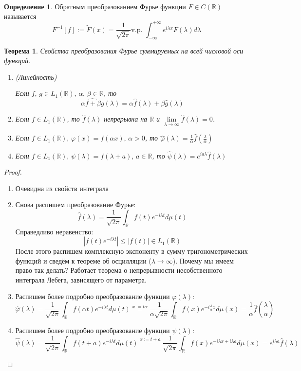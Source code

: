 \documentclass[a4paper,12pt]{article}
\renewcommand{\phi}{\ensuremath{\varphi}}
\renewcommand{\leq}{\ensuremath{\leqslant}}
\theoremstyle{plain}
\newtheorem{theorem}{Теорема}[section]
\theoremstyle{definition}
\newtheorem{definition}{Определение}[section]
\theoremstyle{remark}
\begin{document}
\begin{definition}
	Обратным преобразованием Фурье функции $F \in C(\mathbb{R})$ называется
	\[F^{-1}[f] := \tilde{F}(x) = \frac{1}{\sqrt{2\pi}} \text{v.p. }\int_{-\infty}^{+\infty}e^{i\lambda x}F(\lambda)d\lambda\]
\end{definition}

\begin{theorem}
	Свойства преобразования Фурье суммируемых на всей числовой оси функций.

	\begin{enumerate}
		\item (Линейность)

		      Если $f,\,g \in L_1(\mathbb{R}),\, \alpha,\, \beta \in \mathbb{R}$, то
		      \[\widehat{\alpha f + \beta g}(\lambda) = \alpha\hat{f}(\lambda) + \beta\hat{g}(\lambda)\]
		\item Если $f \in L_1(\mathbb{R})$, то $\hat{f}(\lambda)$ непрерывна на $\mathbb{R}$ и $\lim\limits_{\lambda \to \infty}\hat{f}(\lambda) = 0$.
		\item Если $f \in L_1(\mathbb{R}),\, \phi(x) = f(\alpha x),\, \alpha > 0$, то $\hat{\phi}(\lambda) = \frac{1}{\alpha}\hat{f}(\frac{\lambda}{\alpha})$
		\item Если $f \in L_1(\mathbb{R}),\, \psi(\lambda) = f(\lambda + a),\, a \in \mathbb{R}$, то $\hat{\psi}(\lambda) = e^{ia\lambda}\hat{f}(\lambda)$
	\end{enumerate}
\end{theorem}
\begin{proof}
	\begin{enumerate}
		\item Очевидна из свойств интеграла
		\item Снова распишем преобразование Фурье:
		      \[\hat{f}(\lambda) = \frac{1}{\sqrt{2\pi}}\int_\mathbb{R} f(t)e^{-i\lambda t}d\mu(t)\]
		      Справедливо неравенство:
		      \[|f(t)e^{-i\lambda t}| \leq |f(t)| \in L_1(\mathbb{R})\]
		      После этого распишем комплексную экспоненту в сумму тригонометрических функций и сведём к теореме об осцилляции ($\lambda \to \infty$). Почему мы имеем право так делать? Работает теорема о непрерывности несобственного интеграла Лебега, зависящего от параметра.
		\item Распишем более подробно преобразование функции $\phi(\lambda)$:
		      \[\hat{\phi}(\lambda) = \frac{1}{\sqrt{2\pi}}\int_\mathbb{R} f(\alpha t)e^{-i\lambda t}d\mu(t) \stackrel{x := t\alpha}{=} \frac{1}{\alpha\sqrt{2\pi}}\int_\mathbb{R}f(x)e^{-i\frac{\lambda}{\alpha}x}d\mu(x) = \frac{1}{\alpha}\hat{f}(\frac{\lambda}{\alpha})\]
		\item Распишем более подробно преобразование функции $\psi(\lambda)$:
		      \[\hat{\psi}(\lambda) = \frac{1}{\sqrt{2\pi}}\int_\mathbb{R} f(t + a)e^{-i\lambda t}d\mu(t) \stackrel{x := t + a}{=} \frac{1}{\sqrt{2\pi}}\int_\mathbb{R}f(x)e^{-i\lambda x + i\lambda a}d\mu(x) = e^{i\lambda a}\hat{f}(\lambda)\]
	\end{enumerate}
\end{proof}
\end{document}
